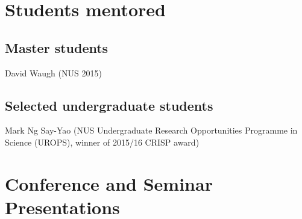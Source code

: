 \documentclass[12pt,a4paper]{article}
\begin{document}
\section*{Students mentored}

\subsection*{Master students}

David Waugh (NUS 2015)

\subsection*{Selected undergraduate students}

Mark Ng Say-Yao (NUS Undergraduate Research Opportunities Programme in Science (UROPS), winner of 2015/16 CRISP award)

\section*{Conference and Seminar Presentations}
\end{document}
